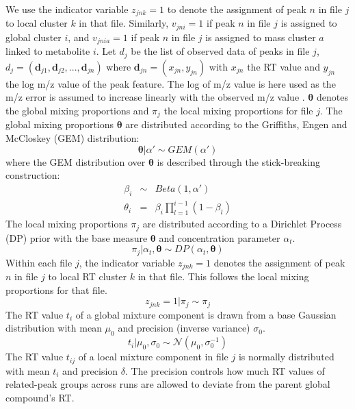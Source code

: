 We use the indicator variable $z_{jnk}=1$ to denote the assignment of peak $n$ in file $j$ to local cluster $k$ in that file. Similarly, $v_{jni}=1$ if peak $n$ in file $j$ is assigned to global cluster $i$, and $v_{jnia}=1$ if peak $n$ in file $j$ is assigned to mass cluster $a$ linked to metabolite $i$. Let $d_{j}$ be the list of observed data of peaks in file $j$, $d_{j}=(\mathbf{d}_{j1},\mathbf{d}_{j2},...,\mathbf{d}_{jn})$ where $\mathbf{d}_{jn}=(x_{jn},y_{jn})$ with $x_{jn}$ the RT value and $y_{jn}$ the log m/z value of the peak feature. The log of m/z value is here used as the m/z error is assumed to increase linearly with the observed m/z value \cite{Perera2011}. $\boldsymbol{\theta}$ denotes the global mixing proportions and $\pi_{j}$ the local mixing proportions for file $j$. The global mixing proportions $\boldsymbol{\theta}$ are distributed according to the Griffiths, Engen and McCloskey (GEM) distribution:
\begin{equation}
    \boldsymbol{\theta} \vert \alpha'\sim GEM(\alpha')
\end{equation}
where the GEM distribution over $\boldsymbol{\theta}$ is described through the stick-breaking construction: 
\begin{eqnarray}
	\beta_{i} & \sim & Beta(1,\alpha')\\
	\theta_{i} & = & \beta_{i}\prod_{l=1}^{i-1}(1-\beta_{l})
\end{eqnarray}
The local mixing proportions $\pi_{j}$ are distributed according to a Dirichlet Process (DP) prior with the base measure $\boldsymbol{\theta}$ and concentration parameter $\alpha_{t}$. 
\begin{equation}
	\pi_{j} \vert \alpha_{t},\boldsymbol{\theta}\sim DP(\alpha_{t},\boldsymbol{\theta})
\end{equation}
Within each file $j$, the indicator variable $z_{jnk}=1$ denotes the assignment of peak $n$ in file $j$ to local RT cluster $k$ in that file. This follows the local mixing proportions for that file.
\begin{equation}
	z_{jnk}=1 \vert \pi_{j}\sim\pi_{j}
\end{equation}
The RT value $t_{i}$ of a global mixture component is drawn from a base Gaussian distribution with mean $\mu_{0}$ and precision (inverse variance) $\sigma_{0}$. 
\begin{equation}
	t_{i} \vert \mu_{0},\sigma_{0}\sim\mathcal{N}(\mu_{0},\sigma_{0}^{-1})\label{eq:draw_ti}
\end{equation}
The RT value $t_{ij}$ of a local mixture component in file $j$ is normally distributed with mean $t_{i}$ and precision $\delta$. The precision controls how much RT values of related-peak groups across runs are allowed to deviate from the parent global compound's RT. 
